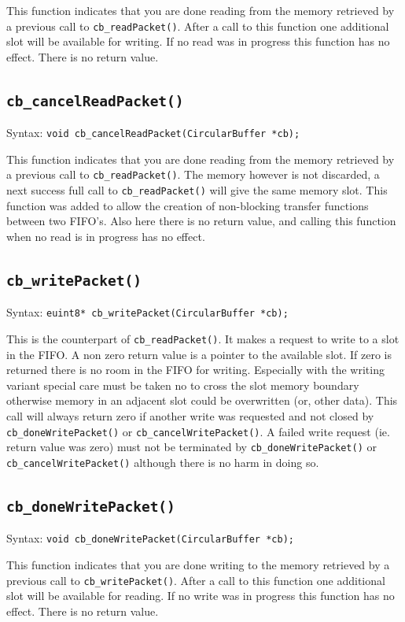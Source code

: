 \documentclass[a4paper]{article}
\begin{document}
This function indicates that you are done reading from the memory retrieved by a previous call to \texttt{cb\_readPacket()}.
After a call to this function one additional slot will be available for writing. If no read was in progress this function has
no effect. There is no return value.

\subsection*{\texttt{cb\_cancelReadPacket()}}
Syntax: \lstinline!void cb_cancelReadPacket(CircularBuffer *cb);!

This function indicates that you are done reading from the memory retrieved by a previous call to \texttt{cb\_readPacket()}.
The memory however is not discarded, a next success full call to \texttt{cb\_readPacket()} will give the same memory slot.
This function was added to allow the creation of non-blocking transfer functions between two FIFO's.
Also here there is no return value, and calling this function when no read is in progress has no effect.

\subsection*{\texttt{cb\_writePacket()}}
Syntax: \lstinline!euint8* cb_writePacket(CircularBuffer *cb);!

This is the counterpart of \texttt{cb\_readPacket()}. It makes a request to write to a slot in the FIFO.
A non zero return value is a pointer to the available slot. If zero is returned there is no room in the FIFO for writing.
Especially with the writing variant special care must be taken no to cross the slot memory boundary otherwise memory
in an adjacent slot could be overwritten (or, other data). This call will always return zero if another write was requested and not
closed by \texttt{cb\_doneWritePacket()} or \texttt{cb\_cancelWritePacket()}. A failed write request (ie. return value was zero) must not
be terminated by \texttt{cb\_doneWritePacket()} or \texttt{cb\_cancelWritePacket()} although there is no harm in doing so.

\subsection*{\texttt{cb\_doneWritePacket()}}
Syntax: \lstinline!void cb_doneWritePacket(CircularBuffer *cb);!

This function indicates that you are done writing to the memory retrieved by a previous call to \texttt{cb\_writePacket()}.
After a call to this function one additional slot will be available for reading. If no write was in progress this function has
no effect. There is no return value.
\end{document}
